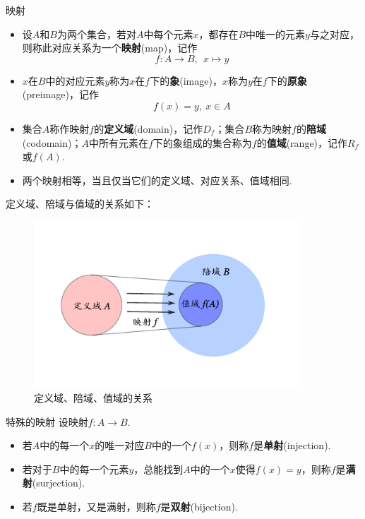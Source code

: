 \documentclass[lang=cn, zihao=5]{elegantbook}
\begin{document}
\begin{definition}{映射}
	\begin{itemize}
		\item 设$A$和$B$为两个集合，若对$A$中每个元素$x$，都存在$B$中唯一的元素$y$与之对应，则称此对应关系为一个\textbf{映射}(map)，记作$$f:A \to B,~~x \mapsto y$$
		\item $x$在$B$中的对应元素$y$称为$x$在$f$下的\textbf{象}(image)，$x$称为$y$在$f$下的\textbf{原象}(preimage)，记作$$f(x) = y,~ x \in A$$
		\item 集合$A$称作映射$f$的\textbf{定义域}(domain)，记作$D_f$；集合$B$称为映射$f$的\textbf{陪域}(codomain)；$A$中所有元素在$f$下的象组成的集合称为$f$的\textbf{值域}(range)，记作$R_f$或$f(A)$.
		\item 两个映射相等，当且仅当它们的定义域、对应关系、值域相同.
	\end{itemize}
\end{definition}

定义域、陪域与值域的关系如下：

\begin{figure}[h!]
	\centering
	\includegraphics[width=10cm]{attachment/20230403ykue.pdf}
	\caption{定义域、陪域、值域的关系}
\end{figure}

\begin{definition}{特殊的映射}
	设映射$f:A \to B$.
	\begin{itemize}
		\item 若$A$中的每一个$x$的唯一对应$B$中的一个$f(x)$，则称$f$是\textbf{单射}(injection).
		\item 若对于$B$中的每一个元素$y$，总能找到$A$中的一个$x$使得$f(x)=y$，则称$f$是\textbf{满射}(surjection).
		\item 若$f$既是单射，又是满射，则称$f$是\textbf{双射}(bijection).
	\end{itemize}
\end{definition}
\end{document}
